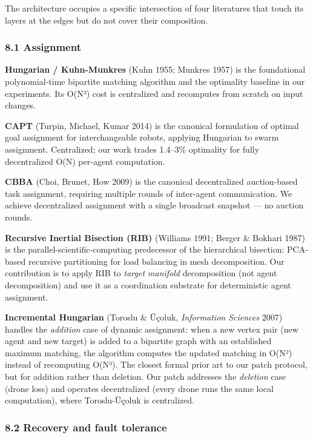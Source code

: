 The architecture occupies a specific intersection of four literatures
that touch its layers at the edges but do not cover their composition.

\subsubsection{8.1 Assignment}\label{assignment}

\textbf{Hungarian / Kuhn-Munkres} (Kuhn 1955; Munkres 1957) is the
foundational polynomial-time bipartite matching algorithm and the
optimality baseline in our experiments. Its O(N³) cost is centralized
and recomputes from scratch on input changes.

\textbf{CAPT} (Turpin, Michael, Kumar 2014) is the canonical formulation
of optimal goal assignment for interchangeable robots, applying
Hungarian to swarm assignment. Centralized; our work trades 1.4--3\%
optimality for fully decentralized O(N) per-agent computation.

\textbf{CBBA} (Choi, Brunet, How 2009) is the canonical decentralized
auction-based task assignment, requiring multiple rounds of inter-agent
communication. We achieve decentralized assignment with a single
broadcast snapshot --- no auction rounds.

\textbf{Recursive Inertial Bisection (RIB)} (Williams 1991; Berger \&
Bokhari 1987) is the parallel-scientific-computing predecessor of the
hierarchical bisection: PCA-based recursive partitioning for load
balancing in mesh decomposition. Our contribution is to apply RIB to
\emph{target manifold} decomposition (not agent decomposition) and use
it as a coordination substrate for deterministic agent assignment.

\textbf{Incremental Hungarian} (Toroslu \& Üçoluk, \emph{Information
Sciences} 2007) handles the \emph{addition} case of dynamic assignment:
when a new vertex pair (new agent and new target) is added to a
bipartite graph with an established maximum matching, the algorithm
computes the updated matching in O(N²) instead of recomputing O(N³). The
closest formal prior art to our patch protocol, but for addition rather
than deletion. Our patch addresses the \emph{deletion} case (drone loss)
and operates decentralized (every drone runs the same local
computation), where Toroslu-Üçoluk is centralized.

\subsubsection{8.2 Recovery and fault
tolerance}\label{recovery-and-fault-tolerance}

